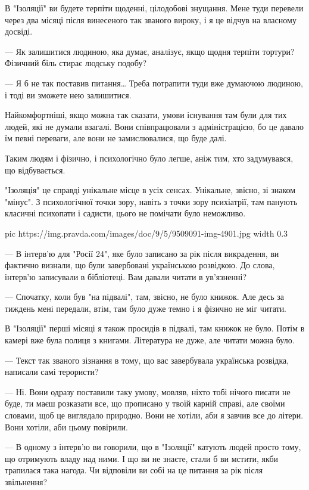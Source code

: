 В "Ізоляції" ви будете терпіти щоденні, цілодобові знущання. Мене туди перевели
через два місяці після винесеного так званого вироку, і я це відчув на власному
досвіді.

— Як залишитися людиною, яка думає, аналізує, якщо щодня терпіти тортури?
Фізичний біль стирає людську подобу?

— Я б не так поставив питання… Треба потрапити туди вже думаючою людиною, і
тоді ви зможете нею залишитися.

Найкомфортніші, якщо можна так сказати, умови існування там були для тих людей,
які не думали взагалі. Вони співпрацювали з адміністрацією, бо це давало їм
певні переваги, але вони не замислювалися, що буде далі.

Таким людям і фізично, і психологічно було легше, аніж тим, хто задумувався, що
відбувається.

"Ізоляція" це справді унікальне місце в усіх сенсах. Унікальне, звісно, зі
знаком "мінус". З психологічної точки зору, навіть з точки зору психіатрії, там
панують класичні психопати і садисти, цього не помічати було неможливо.

\ifcmt
  pic https://img.pravda.com/images/doc/9/5/9509091-img-4901.jpg
	width 0.3
\fi

— В інтерв'ю для "Росії 24", яке було записано за рік після викрадення, ви
фактично визнали, що були завербовані українською розвідкою. До слова, інтерв’ю
записували в бібліотеці. Вам давали читати в ув'язненні?

— Спочатку, коли був "на підвалі", там, звісно, не було книжок. Але десь за
тиждень мені передали, втім, там було дуже темно і я фізично не міг читати.

В "Ізоляції" перші місяці я також просидів в підвалі, там книжок не було. Потім
в камері вже була полиця з книгами. Література не дуже, але читати можна було.

— Текст так званого зізнання в тому, що вас завербувала українська розвідка,
написали самі терористи?

— Ні. Вони одразу поставили таку умову, мовляв, ніхто тобі нічого писати не
буде, ти маєш розказати все, що прописано у твоїй карній справі, але своїми
словами, щоб це виглядало природно. Вони не хотіли, аби я завчив все до літери.
Вони хотіли, аби цьому повірили.

— В одному з інтерв'ю ви говорили, що в "Ізоляції" катують людей просто тому,
що отримують владу над ними. І що ви не знаєте, стали б ви мстити, якби
трапилася така нагода. Чи відповіли ви собі на це питання за рік після
звільнення?

